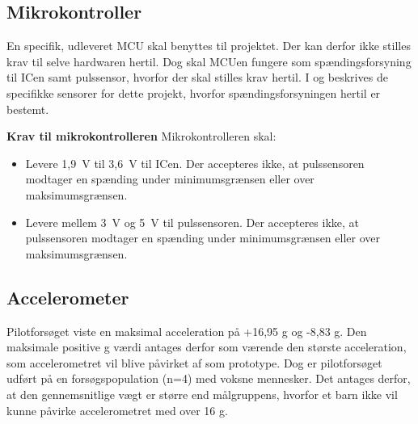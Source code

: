 \subsection{Mikrokontroller} \label{krav_mikro_spaending}
En specifik, udleveret MCU skal benyttes til projektet. Der kan derfor ikke stilles krav til selve hardwaren hertil. Dog skal MCUen fungere som spændingsforsyning til ICen samt pulssensor, hvorfor der skal stilles krav hertil. I  og  beskrives de specifikke sensorer for dette projekt, hvorfor spændingsforsyningen hertil er bestemt.

\textbf{Krav til mikrokontrolleren} \newline 
Mikrokontrolleren skal:
\begin{itemize}
	\item Levere 1,9~V til 3,6~V til ICen. Der accepteres ikke, at pulssensoren modtager en spænding under minimumsgrænsen eller over maksimumsgrænsen.
	\item Levere mellem 3~V og 5~V til pulssensoren. Der accepteres ikke, at pulssensoren modtager en spænding under minimumsgrænsen eller over maksimumsgrænsen.
\end{itemize}

\subsection{Accelerometer}\label{krav:acc}
Pilotforsøget viste en maksimal acceleration på +16,95 g og -8,83 g. Den maksimale positive g værdi antages derfor som værende den største acceleration, som accelerometret vil blive påvirket af som prototype. Dog er pilotforsøget udført på en forsøgspopulation (n=4) med voksne mennesker. Det antages derfor, at den gennemsnitlige vægt er større end målgruppens, hvorfor et barn ikke vil kunne påvirke accelerometret med over 16 g. %

